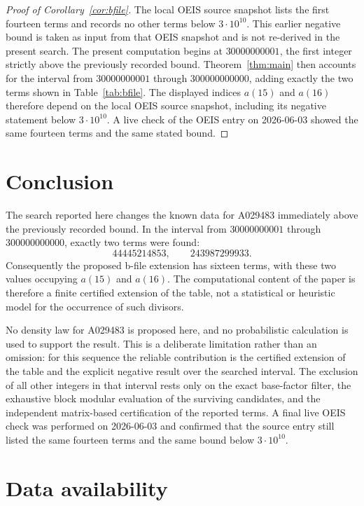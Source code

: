 \documentclass[11pt]{article}
\theoremstyle{definition}
\theoremstyle{remark}
\begin{document}
\begin{proof}[Proof of Corollary~\ref{cor:bfile}]
The local OEIS source snapshot lists the first fourteen terms and records no
other terms below \(3\cdot 10^{10}\).  This earlier negative bound is taken as
input from that OEIS snapshot and is not re-derived in the present search.
The present computation begins at \(30000000001\), the first integer strictly
above the previously recorded bound.  Theorem~\ref{thm:main} then accounts for
the interval from \(30000000001\) through \(300000000000\), adding exactly the
two terms shown in Table~\ref{tab:bfile}.  The displayed indices \(a(15)\) and
\(a(16)\) therefore depend on the local OEIS source snapshot, including its
negative statement below \(3\cdot 10^{10}\).  A live check of the OEIS entry on
2026-06-03 showed the same fourteen terms and the same stated bound.
\end{proof}

\section{Conclusion}

The search reported here changes the known data for A029483 immediately above
the previously recorded bound.  In the interval from \(30000000001\) through
\(300000000000\), exactly two terms were found:
\[
  44445214853,\qquad 243987299933.
\]
Consequently the proposed b-file extension has sixteen terms, with these two
values occupying \(a(15)\) and \(a(16)\).  The computational content of the
paper is therefore a finite certified extension of the table, not a statistical
or heuristic model for the occurrence of such divisors.

No density law for A029483 is proposed here, and no probabilistic calculation
is used to support the result.  This is a deliberate limitation rather than an
omission: for this sequence the reliable contribution is the certified
extension of the table and the explicit negative result over the searched
interval.  The exclusion of all other integers in that interval rests only on
the exact base-factor filter, the exhaustive block modular evaluation of the
surviving candidates, and the independent matrix-based certification of the
reported terms.  A final live OEIS check was performed on 2026-06-03 and
confirmed that the source entry still listed the same fourteen terms and the
same bound below \(3\cdot 10^{10}\).

\section*{Data availability}
\end{document}
